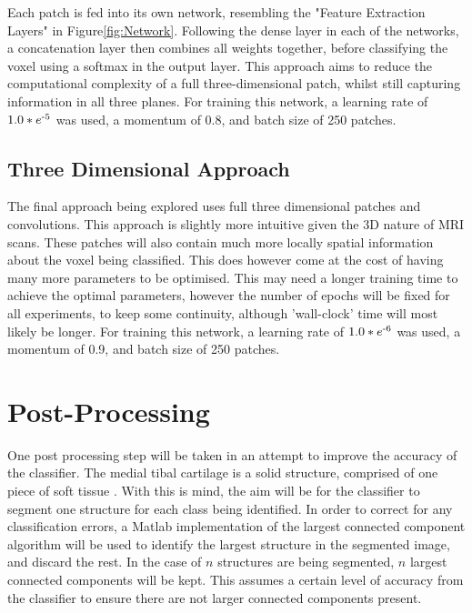 \documentclass[11pt,a4paper]{memoir}
\numberwithin{figure}{section}
\numberwithin{table}{section}
\numberwithin{equation}{section}
\begin{document}
Each patch is fed into its own network, resembling the "Feature Extraction Layers" in Figure\ref{fig:Network}. Following the dense layer in each of the networks, a concatenation layer then combines all weights together, before classifying the voxel using a softmax in the output layer. This approach aims to reduce the computational complexity of a full three-dimensional patch, whilst still capturing information in all three planes. For training this network, a learning rate of $1.0*e\textsuperscript{-5}$ was used, a momentum of 0.8, and batch size of 250 patches. 




\subsection{Three Dimensional Approach}
The final approach being explored uses full three dimensional patches and convolutions. This approach is slightly more intuitive given the 3D nature of MRI scans. These patches will also contain much more locally spatial information about the voxel being classified. This does however come at the cost of having many more parameters to be optimised. This may need a longer training time to achieve the optimal parameters, however the number of epochs will be fixed for all experiments, to keep some continuity, although 'wall-clock' time will most likely be longer. For training this network, a learning rate of $1.0*e\textsuperscript{-6}$ was used, a momentum of 0.9, and batch size of 250 patches.


\section{Post-Processing}
One post processing step will be taken in an attempt to improve the accuracy of the classifier. The medial tibal cartilage is a solid structure, comprised of one piece of soft tissue \cite{Majumdar2010AdvancesOsteoarthritis}. With this is mind, the aim will be for the classifier to segment one structure for each class being identified. In order to correct for any classification errors, a Matlab \cite{MATLAB:2010} implementation of the largest connected component algorithm will be used to identify the largest structure in the segmented image, and discard the rest. In the case of $n$ structures are being segmented, $n$ largest connected components will be kept. This assumes a certain level of accuracy from the classifier to ensure there are not larger connected components present. 
\end{document}

